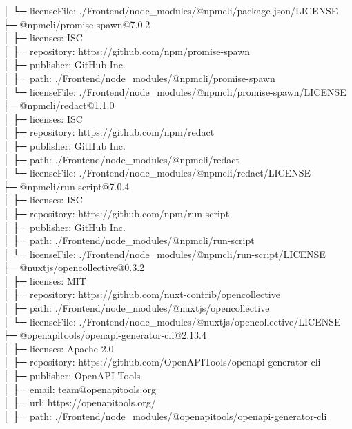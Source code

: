 │  └─ licenseFile: ./Frontend/node\_modules/@npmcli/package-json/LICENSE\\
├─ @npmcli/promise-spawn@7.0.2\\
│  ├─ licenses: ISC\\
│  ├─ repository: https://github.com/npm/promise-spawn\\
│  ├─ publisher: GitHub Inc.\\
│  ├─ path: ./Frontend/node\_modules/@npmcli/promise-spawn\\
│  └─ licenseFile: ./Frontend/node\_modules/@npmcli/promise-spawn/LICENSE\\
├─ @npmcli/redact@1.1.0\\
│  ├─ licenses: ISC\\
│  ├─ repository: https://github.com/npm/redact\\
│  ├─ publisher: GitHub Inc.\\
│  ├─ path: ./Frontend/node\_modules/@npmcli/redact\\
│  └─ licenseFile: ./Frontend/node\_modules/@npmcli/redact/LICENSE\\
├─ @npmcli/run-script@7.0.4\\
│  ├─ licenses: ISC\\
│  ├─ repository: https://github.com/npm/run-script\\
│  ├─ publisher: GitHub Inc.\\
│  ├─ path: ./Frontend/node\_modules/@npmcli/run-script\\
│  └─ licenseFile: ./Frontend/node\_modules/@npmcli/run-script/LICENSE\\
├─ @nuxtjs/opencollective@0.3.2\\
│  ├─ licenses: MIT\\
│  ├─ repository: https://github.com/nuxt-contrib/opencollective\\
│  ├─ path: ./Frontend/node\_modules/@nuxtjs/opencollective\\
│  └─ licenseFile: ./Frontend/node\_modules/@nuxtjs/opencollective/LICENSE\\
├─ @openapitools/openapi-generator-cli@2.13.4\\
│  ├─ licenses: Apache-2.0\\
│  ├─ repository: https://github.com/OpenAPITools/openapi-generator-cli\\
│  ├─ publisher: OpenAPI Tools\\
│  ├─ email: team@openapitools.org\\
│  ├─ url: https://openapitools.org/\\
│  ├─ path: ./Frontend/node\_modules/@openapitools/openapi-generator-cli\\
